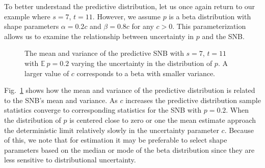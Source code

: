 \documentclass[review]{elsarticle}
\begin{document}
To better understand the predictive distribution, let us once again return to 
our example where $s=7$, $t=11$. However, we assume $p$ is a beta distribution
with shape parameters $\alpha = 0.2 c$ and 
$\beta = 0.8 c$ for any $c > 0$.
This parameterization allows us to examine the relationship between 
uncertainty in $p$ and the SNB.

\begin{figure}[h!]
\centering
{}
\hfill
{}
\caption{
The mean and variance of the predictive SNB with $s=7$, $t=11$
with $\mathbb{E}\ p = 0.2$ varying the uncertainty 
in the distribution of $p$. A larger value of $c$
corresponds to a beta with smaller variance.
}
\label{fig:bayesian-sample-size}
\end{figure}

Fig.~\ref{fig:bayesian-sample-size} shows how the mean
and variance of the predictive distribution is related to the SNB's 
mean and variance. As $c$ increases the 
predictive distribution sample statistics converge to corresponding 
statistics for the SNB with $p = 0.2$. 
When the distribution of $p$ is centered close to zero or one the mean 
estimate approach the deterministic limit relatively slowly in the uncertainty
parameter $c$.  Because of this, we note that for estimation it may be 
preferable to select shape parameters based on the median or mode of the 
beta distribution since they are less sensitive to distributional uncertainty.
\end{document}
